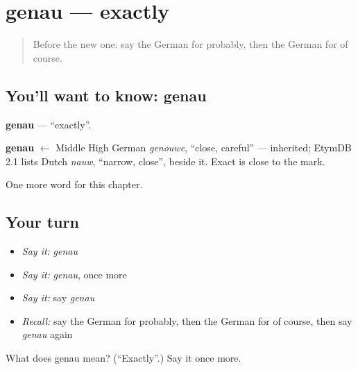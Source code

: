 \section[genau]{genau — exactly}

\label{lesson:GE-C172-genau}



\begin{quote}
Before the new one: say the German for probably, then the German for of course.
\end{quote}

\subsection*{You'll want to know: genau}
\textbf{genau} — \textquotedblleft{}exactly\textquotedblright{}.

\begin{cousinweb}
\textbf{genau} $\leftarrow$ Middle High German \emph{genouwe}, \textquotedblleft{}close, careful\textquotedblright{} — inherited; EtymDB 2.1 lists Dutch \emph{nauw}, \textquotedblleft{}narrow, close\textquotedblright{}, beside it. Exact is close to the mark.
\end{cousinweb}

\begin{grammarlens}[title={What you've built}]
One more word for this chapter.
\end{grammarlens}

\subsection*{Your turn}
\begin{itemize}
\raggedright
  \item \emph{Say it:} \emph{genau}
  \item \emph{Say it:} \emph{genau}, once more
  \item \emph{Say it:} say \emph{genau}
  \item \emph{Recall:} say the German for probably, then the German for of course, then say \emph{genau} again
\end{itemize}

\begin{tcolorbox}[breakable,colback=teal!4,colframe=teal!35!black,title={Before you move on}]
What does genau mean? (\textquotedblleft{}Exactly\textquotedblright{}.) Say it once more.
\end{tcolorbox}
